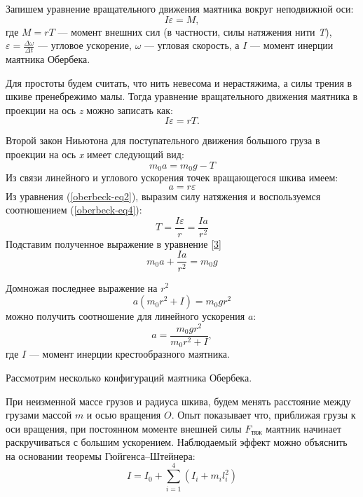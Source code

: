 \documentclass[14pt,a4paper,oneside]{extarticle}	%
\begin{document}
	Запишем уравнение вращательного движения маятника вокруг неподвижной оси:
	\begin{equation}\label{oberbeck-eq1}
	I\varepsilon = M,
	\end{equation}
	где $ M=rT $ — момент внешних сил (в частности, силы натяжения нити \textit{T}), $ \varepsilon = \frac{\Delta\omega}{\Delta t} $ — угловое ускорение, $ \omega $ — угловая скорость, а $ I $ — момент инерции маятника Обербека.
	
	Для простоты будем считать, что нить невесома и нерастяжима, а  силы трения в шкиве пренебрежимо малы.
	Тогда уравнение вращательного движения маятника в проекции на ось \textit{z} можно записать как:
	\begin{equation}\label{oberbeck-eq2}
	I\varepsilon = rT. 
	\end{equation}
	
	Второй закон Ниьютона для поступательного движения большого груза в проекции на ось \textit{x} имеет следующий вид:
	\begin{equation}\label{oberbeck-eq3}
	m_0a = m_0g - T
	\end{equation}
	Из связи линейного и углового ускорения точек вращающегося шкива имеем:
	\begin{equation}\label{oberbeck-eq4}
	a = r\varepsilon 
	\end{equation}
	Из уравнения (\ref{oberbeck-eq2}), выразим силу натяжения и воспользуемся соотношением (\ref{oberbeck-eq4}):
	\begin{equation}\label{oberbeck-eq5}
	T = \frac{I\varepsilon}{r} = \frac{Ia}{r^{2}}
	\end{equation}
	Подставим полученное выражение в уравнение \ref{3}
	\begin{equation}\label{oberbeck-eq6}
	m_0a + \frac{Ia}{r^{2}} = m_0g 
	\end{equation}
	
	Домножая последнее выражение на $ r^{2} $
	\begin{equation}\label{oberbeck-eq7}
	a(m_0r^{2} + I) = m_0gr^{2} 
	\end{equation}
	можно получить соотношение для линейного ускорения $ a $:
		\begin{equation}\label{oberbeck-eq8}
	a = \frac{m_0gr^{2}}{m_0r^{2} + I},
	\end{equation}
	где $ I $ — момент инерции крестообразного маятника.
	
   Рассмотрим несколько конфигураций маятника Обербека.
            
  При неизменной массе грузов и радиуса шкива, будем менять расстояние между грузами массой $ m $ и осью вращения $ O $.
    Опыт показывает что, приближая грузы к оси вращения, при постоянном моменте внешней силы $ F_{\text{тяж}} $ маятник начинает раскручиваться с большим ускорением.
    Наблюдаемый эффект можно объяснить на основании теоремы Гюйгенса–Штейнера: 
    \begin{equation}\label{oberbeck-eq9}
    I = I_{0} + \sum_{i = 1}^{4}(I_{i}+m_{i}l_{i}^{2})
    \end{equation}
    
\end{document}
